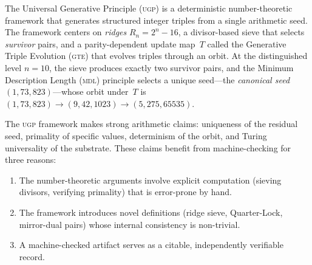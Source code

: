 \documentclass[11pt,a4paper]{article}
\theoremstyle{definition}
\newcommand{\Rn}{R_n}
\newcommand{\ugp}{\textsc{ugp}}
\newcommand{\gte}{\textsc{gte}}
\newcommand{\mdl}{\textsc{mdl}}
\begin{document}
The Universal Generative Principle (\ugp{}) is a deterministic
number-theoretic framework that generates structured integer triples from
a single arithmetic seed.  The framework centers on \emph{ridges}
$\Rn = 2^n - 16$, a divisor-based sieve that selects \emph{survivor}
pairs, and a parity-dependent update map~$T$ called the Generative
Triple Evolution (\gte{}) that evolves triples through an orbit.  At the
distinguished level $n = 10$, the sieve produces exactly two survivor
pairs, and the Minimum Description Length (\mdl{}) principle selects a
unique seed---the \emph{canonical seed}
$(1, 73, 823)$---whose orbit under~$T$ is
$(1,73,823) \to (9,42,1023) \to (5,275,65535)$.

The \ugp{} framework makes strong arithmetic claims: uniqueness of the
residual seed, primality of specific values, determinism of the orbit,
and Turing universality of the substrate.  These claims benefit from
machine-checking for three reasons:
\begin{enumerate}[nosep]
\item The number-theoretic arguments involve explicit computation
  (sieving divisors, verifying primality) that is error-prone by hand.
\item The framework introduces novel definitions (ridge sieve,
  Quarter-Lock, mirror-dual pairs) whose internal consistency is
  non-trivial.
\item A machine-checked artifact serves as a citable, independently
  verifiable record.
\end{enumerate}
\end{document}
